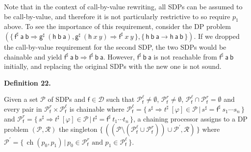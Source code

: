 \documentclass[10pt,a4paper]{amsart}
\begin{document}
Note that in the context of call-by-value rewriting, all SDPs can be assumed to be call-by-value, and therefore it is not particularly restrictive to so require $p_{1}$ above. To see the importance of this requirement, consider the DP problem $(\{\,{{{\mathsf{f}^{\sharp}}\ {\mathsf{a}}}\ {\mathsf{b}}}\Rightarrow{{\mathsf{g}^{\sharp}}\ {({{\mathsf{h}}\ {\mathsf{b}}}\ {\mathsf{a}})}},{{\mathsf{g}^{\sharp}}\ {({{\mathsf{h}}\ {x}}\ {y})}}\Rightarrow{{{\mathsf{f}^{\sharp}}\ {x}}\ {y}}\,\},\{\,{{\mathsf{h}}\ {\mathsf{b}}}\ {\mathsf{a}}\rightarrow{{\mathsf{h}}\ {\mathsf{a}}}\ {\mathsf{b}}\,\})$. If we dropped the call-by-value requirement for the second SDP, the two SDPs would be chainable and yield ${{{\mathsf{f}^{\sharp}}\ {\mathsf{a}}}\ {\mathsf{b}}}\Rightarrow{{{\mathsf{f}^{\sharp}}\ {\mathsf{b}}}\ {\mathsf{a}}}$. However, ${{\mathsf{f}^{\sharp}}\ {\mathsf{b}}}\ {\mathsf{a}}$ is not reachable from ${{\mathsf{f}^{\sharp}}\ {\mathsf{a}}}\ {\mathsf{b}}$ initially, and replacing the original SDPs with the new one is not sound.\par
 
 
 
\par\medskip\noindent\textbf{Definition 22.}\par
 
 
Given a set $\mathcal{P}$ of SDPs and $\mathsf{f}\in\mathcal{D}$ such that $\mathcal{P}_{\mathsf{f}}^{\ell}\neq\emptyset$, $\mathcal{P}_{\mathsf{f}}^{r}\neq\emptyset$, $\mathcal{P}_{\mathsf{f}}^{\ell}\cap\mathcal{P}_{\mathsf{f}}^{r}=\emptyset$ and every pair in $\mathcal{P}_{\mathsf{f}}^{r}\times\mathcal{P}_{\mathsf{f}}^{\ell}$ is chainable where $\mathcal{P}_{\mathsf{f}}^{\ell}=\{\,{s^{\sharp}}\Rightarrow{t^{\sharp}}\ [\varphi]\in\mathcal{P}\,|\,s^{\sharp}={\mathsf{f}^{\sharp}}\ {{s}_{1}\cdots{s}_{n}}\,\}$ and $\mathcal{P}_{\mathsf{f}}^{r}=\{\,{s^{\sharp}}\Rightarrow{t^{\sharp}}\ [\varphi]\in\mathcal{P}\,|\,t^{\sharp}={\mathsf{f}^{\sharp}}\ {{t}_{1}\cdots{t}_{n}}\,\}$, a chaining processor assigns to a DP problem $(\mathcal{P},\mathcal{R})$ the singleton $\{\,((\mathcal{P}\setminus(\mathcal{P}_{\mathsf{f}}^{\ell}\cup\mathcal{P}_{\mathsf{f}}^{r}))\cup\mathcal{P}^{\prime},\mathcal{R})\,\}$ where $\mathcal{P}^{\prime}=\{\,\operatorname{ch}(p_{0},p_{1})\,|\,p_{0}\in\mathcal{P}_{\mathsf{f}}^{r}\text{ and }p_{1}\in\mathcal{P}_{\mathsf{f}}^{\ell}\,\}$.\par
 
\end{document}
